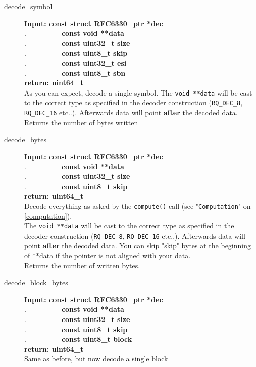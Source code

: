 \documentclass[11pt,a4paper]{refart}
\begin{document}
\begin{description}
\item[decode\_symbol]\textbf{Input: const struct RFC6330\_ptr *dec}\\
.\ \ \ \ \ \ \ \ \ \ \textbf{const void **data}\\
.\ \ \ \ \ \ \ \ \ \ \textbf{const uint32\_t size}\\
.\ \ \ \ \ \ \ \ \ \ \textbf{const uint8\_t skip}\\
.\ \ \ \ \ \ \ \ \ \ \textbf{const uint32\_t esi}\\
.\ \ \ \ \ \ \ \ \ \ \textbf{const uint8\_t sbn}\\
\textbf{return: uint64\_t}\\
As you can expect, decode a single symbol. The \texttt{void **data} will be cast to the correct type as specified in the decoder construction (\texttt{RQ\_DEC\_8}, \texttt{RQ\_DEC\_16} etc..). Afterwards data will point \textbf{after} the decoded data.\\
Returns the number of bytes written
\item[decode\_bytes]\textbf{Input: const struct RFC6330\_ptr *dec}\\
.\ \ \ \ \ \ \ \ \ \ \textbf{const void **data}\\
.\ \ \ \ \ \ \ \ \ \ \textbf{const uint32\_t size}\\
.\ \ \ \ \ \ \ \ \ \ \textbf{const uint8\_t skip}\\
\textbf{return: uint64\_t}\\
Decode everything as asked by the \texttt{compute()} call (see "\texttt{Computation}" on \ref{computation}).\\
The \texttt{void **data} will be cast to the correct type as specified in the decoder construction (\texttt{RQ\_DEC\_8}, \texttt{RQ\_DEC\_16} etc..). Afterwards data will point \textbf{after} the decoded data. You can skip "skip" bytes at the beginning of **data if the pointer is not aligned with your data.\\
Returns the number of written bytes.
\item[decode\_block\_bytes]\textbf{Input: const struct RFC6330\_ptr *dec}\\
.\ \ \ \ \ \ \ \ \ \ \textbf{const void **data}\\
.\ \ \ \ \ \ \ \ \ \ \textbf{const uint32\_t size}\\
.\ \ \ \ \ \ \ \ \ \ \textbf{const uint8\_t skip}\\
.\ \ \ \ \ \ \ \ \ \ \textbf{const uint8\_t block}\\
\textbf{return: uint64\_t}\\
Same as before, but now decode a single block
\end{description}






\printindex
\end{document}
